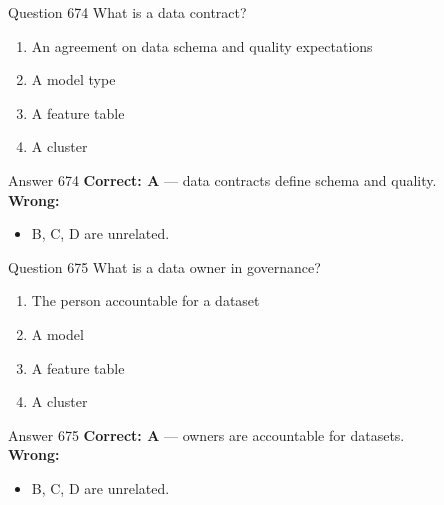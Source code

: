 \documentclass[aspectratio=169,11pt]{beamer}
\begin{document}
	\begin{frame}{Question 674}
		What is a data contract?
		\begin{enumerate}[label=\Alph*.]
			\item An agreement on data schema and quality expectations
			\item A model type
			\item A feature table
			\item A cluster
		\end{enumerate}
	\end{frame}
	\begin{frame}{Answer 674}
		\textbf{Correct: A} --- data contracts define schema and quality.\\
		\vspace{0.5em}
		\textbf{Wrong:}
		\begin{itemize}
			\item B, C, D are unrelated.
		\end{itemize}
	\end{frame}
	
	\begin{frame}{Question 675}
		What is a data owner in governance?
		\begin{enumerate}[label=\Alph*.]
			\item The person accountable for a dataset
			\item A model
			\item A feature table
			\item A cluster
		\end{enumerate}
	\end{frame}
	\begin{frame}{Answer 675}
		\textbf{Correct: A} --- owners are accountable for datasets.\\
		\vspace{0.5em}
		\textbf{Wrong:}
		\begin{itemize}
			\item B, C, D are unrelated.
		\end{itemize}
	\end{frame}
	
\end{document}

